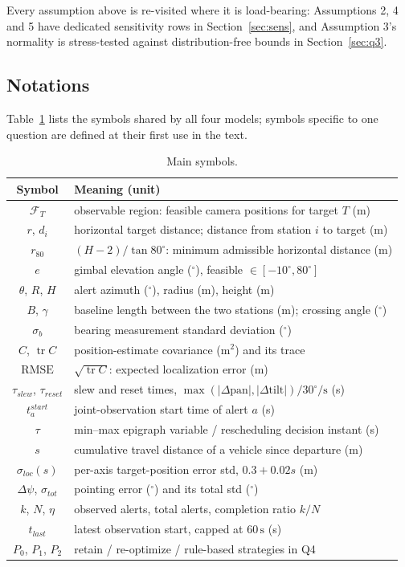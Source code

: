 \noindent Every assumption above is re-visited where it is load-bearing: Assumptions
2, 4 and 5 have dedicated sensitivity rows in Section~\ref{sec:sens}, and Assumption 3's
normality is stress-tested against distribution-free bounds in Section~\ref{sec:q3}.

\subsection{Notations}
Table~\ref{tab:notation} lists the symbols shared by all four models; symbols specific
to one question are defined at their first use in the text.

\begin{table}[!htb]\centering\footnotesize
\caption{Main symbols.}
\label{tab:notation}
\begin{tabular}{cl}
\toprule
Symbol & Meaning (unit) \\
\midrule
$\mathcal{F}_T$ & observable region: feasible camera positions for target $T$ (m) \\
$r$, $d_i$ & horizontal target distance; distance from station $i$ to target (m) \\
$r_{80}$ & $(H-2)/\tan80^\circ$: minimum admissible horizontal distance (m) \\
$e$ & gimbal elevation angle ($^\circ$), feasible $\in[-10^\circ,80^\circ]$ \\
$\theta$, $R$, $H$ & alert azimuth ($^\circ$), radius (m), height (m) \\
$B$, $\gamma$ & baseline length between the two stations (m); crossing angle ($^\circ$) \\
$\sigma_b$ & bearing measurement standard deviation ($^\circ$) \\
$C$, $\operatorname{tr}C$ & position-estimate covariance ($\mathrm{m}^2$) and its trace \\
$\mathrm{RMSE}$ & $\sqrt{\operatorname{tr}C}$: expected localization error (m) \\
$\tau_{slew}$, $\tau_{reset}$ & slew and reset times,
$\max(|\Delta\mathrm{pan}|,|\Delta\mathrm{tilt}|)/30^\circ\mathrm{/s}$ (s) \\
$t^{start}_a$ & joint-observation start time of alert $a$ (s) \\
$\tau$ & min--max epigraph variable / rescheduling decision instant (s) \\
$s$ & cumulative travel distance of a vehicle since departure (m) \\
$\sigma_{loc}(s)$ & per-axis target-position error std, $0.3+0.02s$ (m) \\
$\Delta\psi$, $\sigma_{tot}$ & pointing error ($^\circ$) and its total std ($^\circ$) \\
$k$, $N$, $\eta$ & observed alerts, total alerts, completion ratio $k/N$ \\
$t_{last}$ & latest observation start, capped at $60\,\mathrm{s}$ (s) \\
$P_0$, $P_1$, $P_2$ & retain / re-optimize / rule-based strategies in Q4 \\
\bottomrule
\end{tabular}
\end{table}
